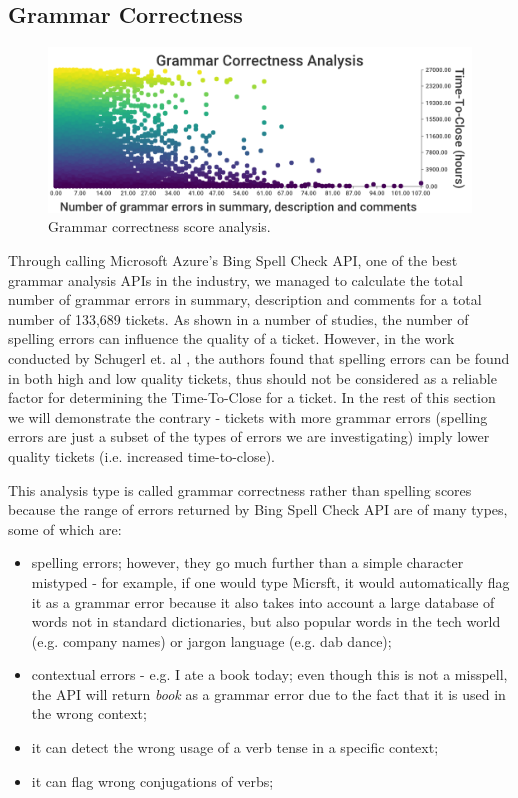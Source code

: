 \documentclass{mpaper}
\begin{document}
\vskip10pt

\subsection{Grammar Correctness}

\begin{figure}[ht]
  \begin{center}
    \includegraphics[scale=0.25]{images/grammar_correctness.png}
  \end{center}
  \caption{\label{grammar}Grammar correctness score analysis.}
\end{figure}

Through calling Microsoft Azure's Bing Spell Check API, one of the best grammar analysis APIs in the industry, we 
managed to calculate the total number of grammar errors in summary, description and comments for a total number 
of 133,689 tickets. As shown in a number of studies, the number of spelling errors can influence the quality of a ticket. 
However, in the work conducted by Schugerl et. al \cite{schugerl2008mining}, the authors found that spelling errors 
can be found in both high and low quality tickets, thus should not be considered as a reliable factor for determining
the Time-To-Close for a ticket. In the rest of this section we will demonstrate the contrary - tickets with more 
grammar errors (spelling errors are just a subset of the types of errors we are investigating) imply lower quality
tickets (i.e. increased time-to-close). 

This analysis type is called grammar correctness rather than spelling scores because the range of errors returned 
by Bing Spell Check API are of many types, some of which are:
\begin{itemize}
  \item spelling errors; however, they go much further than a simple character mistyped - for example,
  if one would type Micrsft, it would automatically flag it as a grammar error because it also takes into account a large 
  database of words not in standard dictionaries, but also popular words in the tech world (e.g. company names) or 
  jargon language (e.g. dab dance);
  \item contextual errors - e.g. I ate a book today; even though this is not a misspell, the API will return \emph{book} as 
  a grammar error due to the fact that it is used in the wrong context;
  \item it can detect the wrong usage of a verb tense in a specific context;
  \item it can flag wrong conjugations of verbs;
\end{itemize}
\end{document}
